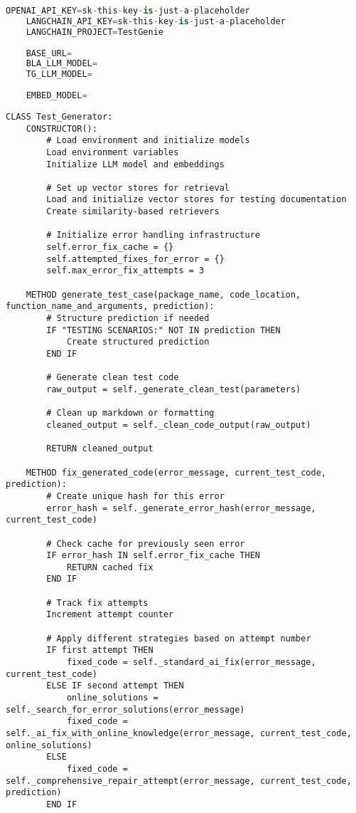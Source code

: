 \begin{lstlisting}[language=Python, caption={$\texttt{Sample .env}$ file.}, label={lst:13}]
    OPENAI_API_KEY=sk-this-key-is-just-a-placeholder
    LANGCHAIN_API_KEY=sk-this-key-is-just-a-placeholder
    LANGCHAIN_PROJECT=TestGenie
    
    BASE_URL=
    BLA_LLM_MODEL=
    TG_LLM_MODEL=
    
    EMBED_MODEL=
\end{lstlisting}

\begin{lstlisting}[language=pseudocode, caption={$\texttt{Test\_Generator}$ class (Pseudocode).}, label={lst:14}]
CLASS Test_Generator:
    CONSTRUCTOR():
        # Load environment and initialize models
        Load environment variables
        Initialize LLM model and embeddings
        
        # Set up vector stores for retrieval
        Load and initialize vector stores for testing documentation
        Create similarity-based retrievers
        
        # Initialize error handling infrastructure
        self.error_fix_cache = {}
        self.attempted_fixes_for_error = {}
        self.max_error_fix_attempts = 3
    
    METHOD generate_test_case(package_name, code_location, function_name_and_arguments, prediction):
        # Structure prediction if needed
        IF "TESTING SCENARIOS:" NOT IN prediction THEN
            Create structured prediction
        END IF
        
        # Generate clean test code
        raw_output = self._generate_clean_test(parameters)
        
        # Clean up markdown or formatting
        cleaned_output = self._clean_code_output(raw_output)
        
        RETURN cleaned_output
    
    METHOD fix_generated_code(error_message, current_test_code, prediction):
        # Create unique hash for this error
        error_hash = self._generate_error_hash(error_message, current_test_code)
        
        # Check cache for previously seen error
        IF error_hash IN self.error_fix_cache THEN
            RETURN cached fix
        END IF
        
        # Track fix attempts
        Increment attempt counter
        
        # Apply different strategies based on attempt number
        IF first attempt THEN
            fixed_code = self._standard_ai_fix(error_message, current_test_code)
        ELSE IF second attempt THEN
            online_solutions = self._search_for_error_solutions(error_message)
            fixed_code = self._ai_fix_with_online_knowledge(error_message, current_test_code, online_solutions)
        ELSE
            fixed_code = self._comprehensive_repair_attempt(error_message, current_test_code, prediction)
        END IF
        

\end{lstlisting}
